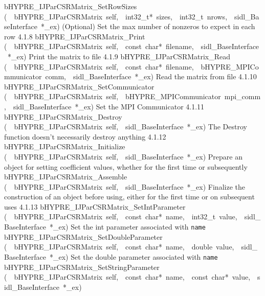 \documentclass{article}
\begin{document}
\begin{cxxentry}
\begin{cxxentry}
\begin{cxxnames}
        {bHYPRE\_IJParCSRMatrix\_SetRowSizes}
        {(\ \ bHYPRE\_IJParCSRMatrix\ self,\ \ int32\_t*\ sizes,\ \ int32\_t\ nrows,\ \ sidl\_BaseInterface\ *\_ex)}
        {
(Optional) Set the max number of nonzeros to expect in each
row}
        {4.1.8}
        {bHYPRE\_IJParCSRMatrix\_Print}
        {(\ \ bHYPRE\_IJParCSRMatrix\ self,\ \ const\ char*\ filename,\ \ sidl\_BaseInterface\ *\_ex)}
        {
Print the matrix to file}
        {4.1.9}
        {bHYPRE\_IJParCSRMatrix\_Read}
        {(\ \ bHYPRE\_IJParCSRMatrix\ self,\ \ const\ char*\ filename,\ \ bHYPRE\_MPICommunicator\ comm,\ \ sidl\_BaseInterface\ *\_ex)}
        {
Read the matrix from file}
        {4.1.10}
        {bHYPRE\_IJParCSRMatrix\_SetCommunicator}
        {(\ \ bHYPRE\_IJParCSRMatrix\ self,\ \ bHYPRE\_MPICommunicator\ mpi\_comm,\ \ sidl\_BaseInterface\ *\_ex)}
        {
Set the MPI Communicator}
        {4.1.11}
        {bHYPRE\_IJParCSRMatrix\_Destroy}
        {(\ \ bHYPRE\_IJParCSRMatrix\ self,\ \ sidl\_BaseInterface\ *\_ex)}
        {
The Destroy function doesn't necessarily destroy anything}
        {4.1.12}
        {bHYPRE\_IJParCSRMatrix\_Initialize}
        {(\ \ bHYPRE\_IJParCSRMatrix\ self,\ \ sidl\_BaseInterface\ *\_ex)}
        {
Prepare an object for setting coefficient values, whether for
the first time or subsequently}
        {}
\label{cxx.4.1.23}
        {bHYPRE\_IJParCSRMatrix\_Assemble}
        {(\ \ bHYPRE\_IJParCSRMatrix\ self,\ \ sidl\_BaseInterface\ *\_ex)}
        {
Finalize the construction of an object before using, either
for the first time or on subsequent uses}
        {4.1.13}
        {bHYPRE\_IJParCSRMatrix\_SetIntParameter}
        {(\ \ bHYPRE\_IJParCSRMatrix\ self,\ \ const\ char*\ name,\ \ int32\_t\ value,\ \ sidl\_BaseInterface\ *\_ex)}
        {
Set the int parameter associated with {\tt name}}
        {}
\label{cxx.4.1.24}
        {bHYPRE\_IJParCSRMatrix\_SetDoubleParameter}
        {(\ \ bHYPRE\_IJParCSRMatrix\ self,\ \ const\ char*\ name,\ \ double\ value,\ \ sidl\_BaseInterface\ *\_ex)}
        {
Set the double parameter associated with {\tt name}}
        {}
\label{cxx.4.1.25}
        {bHYPRE\_IJParCSRMatrix\_SetStringParameter}
        {(\ \ bHYPRE\_IJParCSRMatrix\ self,\ \ const\ char*\ name,\ \ const\ char*\ value,\ \ sidl\_BaseInterface\ *\_ex)}

\end{cxxnames}
\end{cxxentry}
\end{cxxentry}
\end{document}
